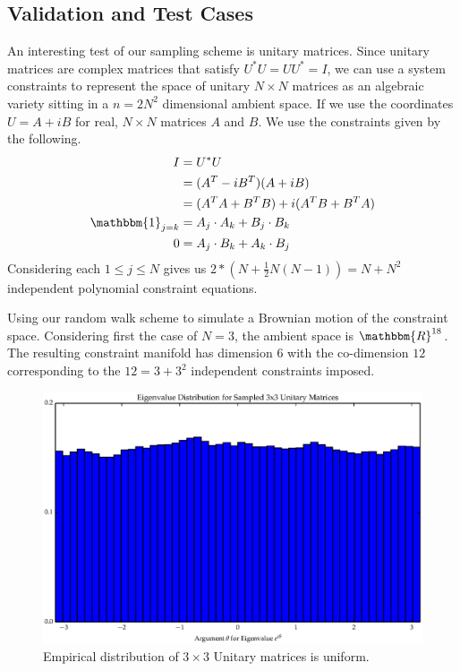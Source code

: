 
\subsection{Validation and Test Cases}

An interesting test of our sampling scheme is unitary matrices. Since unitary matrices are complex matrices that satisfy $U^*U = UU^* = I$, we can use a system constraints to represent the space of unitary $N \times N$ matrices as an algebraic variety sitting in a $n = 2N^2$ dimensional ambient space. If we use the coordinates $U = A + iB$ for real, $N \times N$ matrices $A$ and $B$. We use the constraints given by the following. 
\begin{align}
I &= U^*U \\
&= (A^T - iB^T)(A + iB) \\
&= (A^TA + B^TB) + i(A^TB + B^TA) \\
\mathbbm{1}_{j=k} &= A_j\cdot A_k + B_j\cdot B_k \\
0 &= A_j\cdot B_k + A_k \cdot B_j 
\end{align}
Considering each $1 \leq j \leq N$ gives us $2*(N + \frac{1}{2}N(N-1)) = N + N^2$ independent polynomial constraint equations. 


Using our random walk scheme to simulate a Brownian motion of the constraint space. Considering first the case of $N = 3$, the ambient space is $\mathbbm{R}^{18}$. The resulting constraint manifold has dimension $6$ with the co-dimension $12$ corresponding to the $12 = 3 + 3^2$ independent constraints imposed.  

\begin{figure}[ht]
\centering
  \includegraphics[scale=0.6, angle=0]{images/unitary_3_hist.eps}
\caption{Empirical distribution of $3\times 3$ Unitary matrices is uniform.}
\label{fig:Uny3}
\end{figure}

